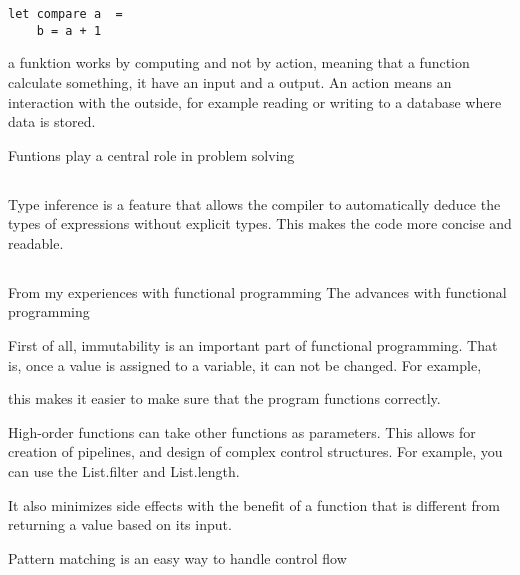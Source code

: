 \documentclass{article}
\begin{document}
 \begin{lstlisting}
let compare a  = 
    b = a + 1
\end{lstlisting}


a funktion works by computing and not by action, meaning that a function calculate something, it have an input and a output. An action means an interaction with the outside, for example reading or writing to a database where data is stored.


Funtions play a central role in problem solving 



\subsection{}
Type inference is a feature that allows the compiler to automatically deduce the types of expressions without explicit types. This makes the code more concise and readable. 




\subsection{}

From my experiences with functional programming The advances with functional programming

First of all, immutability is an important part of functional programming. That is, once a value is assigned to a variable, it can not be changed. For example,

this makes it easier to make sure that the program functions correctly. 


High-order functions can take other functions as parameters. This allows for creation of pipelines, and design of complex control structures. For example, you can use the List.filter and List.length. 


It also minimizes side effects with the benefit of a function that is different from returning a value based on its input. 




Pattern matching is an easy way to handle control flow
\end{document}
